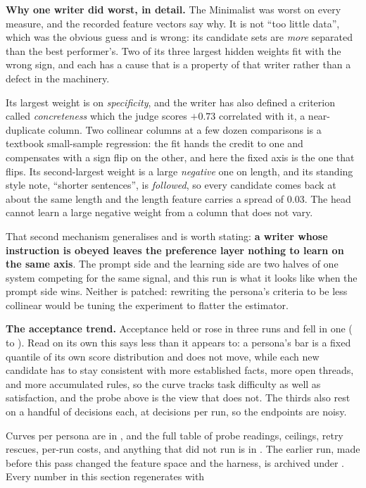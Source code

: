 \documentclass{article}
\newcommand{\file}[1]{\texttt{\small\detokenize{#1}}}
\begin{document}
\textbf{Why one writer did worst, in detail.} The Minimalist was worst on every measure,
and the recorded feature vectors say why. It is not ``too little data'', which was the
obvious guess and is wrong: its candidate sets are \emph{more} separated than the best performer's.
Two of its three largest hidden weights fit with the wrong sign, and each has a cause that
is a property of that writer rather than a defect in the machinery.

Its largest weight is on \emph{specificity}, and the writer has also defined a criterion
called \emph{concreteness} which the judge scores $+0.73$ correlated with it, a
near-duplicate column. Two collinear columns at a few dozen comparisons is a textbook
small-sample regression: the fit hands the credit to one and compensates with a sign flip on
the other, and here the fixed axis is the one that flips. Its second-largest weight is a
large \emph{negative} one on length, and its standing style note, ``shorter
sentences'', is \emph{followed}, so every candidate comes back at about the same length and
the length feature carries a spread of 0.03. The head cannot learn a large negative weight from
a column that does not vary.

That second mechanism generalises and is worth stating: \textbf{a writer whose instruction
is obeyed leaves the preference layer nothing to learn on the same axis}. The prompt side
and the learning side are two halves of one system competing for the same signal, and this
run is what it looks like when the prompt side wins. Neither is patched: rewriting the
persona's criteria to be less collinear would be tuning the experiment to flatter the
estimator.

\textbf{The acceptance trend.} Acceptance held or rose in three runs and fell in one
(\rAcceptanceFellFrom{} to \rAcceptanceFellTo{}). Read on its own this says less than it
appears to: a persona's bar is a
fixed quantile of its own score distribution and does not move, while each new candidate has
to stay consistent with more established facts, more open threads, and more accumulated
rules, so the curve tracks task difficulty as well as satisfaction, and the probe above is
the view that does not. The thirds also rest on a handful of decisions each, at
\rLiveDecisionsPerRun{} decisions per run, so the endpoints are noisy.

Curves per persona are in \file{eval/results/}, and the full table of probe readings,
ceilings, retry rescues, per-run costs, and anything that did not run is in
\file{summary.md}. The earlier run, made before this pass changed the feature space and the
harness, is archived under \file{eval/results/archive/}. Every number in this section
regenerates with
\end{document}
